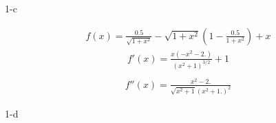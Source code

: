 \documentclass[11pt]{article}
\begin{document}
\begin{prob}{1-c}
\end{prob}
\begin{sol} 

\begin{eqnarray*}
f(x)=\frac{0.5}{\sqrt{1+x^2}}-\sqrt{1+x^2} \left(1-\frac{0.5}{1+x^2}\right)+x 
\end{eqnarray*}
\begin{eqnarray*}
f'(x)=\frac{x \left(-x^2-2.\right)}{\left(x^2+1\right)^{3/2}}+1 \\
\end{eqnarray*}
\begin{eqnarray*}
f''(x)=\frac{x^2-2.}{\sqrt{x^2+1} \left(x^2+1.\right)^2}
\end{eqnarray*}

\end{sol}

\begin{prob}{1-d}
\end{prob}
\begin{sol} 



\end{sol}
\end{document}
